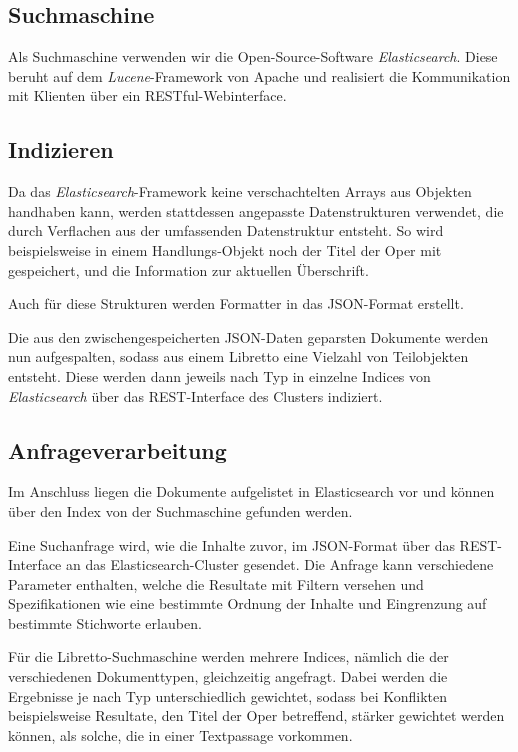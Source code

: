 \subsection{Suchmaschine}
Als Suchmaschine verwenden wir die Open-Source-Software \emph{Elasticsearch}.
Diese beruht auf dem \emph{Lucene}-Framework von Apache
und realisiert die Kommunikation mit Klienten
über ein RESTful-Webinterface.

\subsection{Indizieren}

Da das \emph{Elasticsearch}-Framework
keine verschachtelten Arrays aus Objekten handhaben kann,
werden stattdessen angepasste Datenstrukturen verwendet,
die durch Verflachen aus der umfassenden Datenstruktur entsteht.
So wird beispielsweise in einem Handlungs-Objekt
noch der Titel der Oper mit gespeichert,
und die Information zur aktuellen Überschrift.

Auch für diese Strukturen werden Formatter in das JSON-Format erstellt.

Die aus den zwischengespeicherten JSON-Daten geparsten Dokumente
werden nun aufgespalten, sodass aus einem Libretto eine Vielzahl von
Teilobjekten entsteht.
Diese werden dann jeweils nach Typ in einzelne Indices
von \emph{Elasticsearch} über das REST-Interface des Clusters indiziert.

\subsection{Anfrageverarbeitung}

Im Anschluss liegen die Dokumente aufgelistet in Elasticsearch vor
und können über den Index von der Suchmaschine gefunden werden.

Eine Suchanfrage wird, wie die Inhalte zuvor,
im JSON-Format über das REST-Interface an das Elasticsearch-Cluster gesendet.
Die Anfrage kann verschiedene Parameter enthalten,
welche die Resultate mit Filtern versehen
und Spezifikationen wie eine bestimmte Ordnung der Inhalte
und Eingrenzung auf bestimmte Stichworte erlauben.

Für die Libretto-Suchmaschine werden mehrere Indices,
nämlich die der verschiedenen Dokumenttypen,
gleichzeitig angefragt.
Dabei werden die Ergebnisse je nach Typ unterschiedlich gewichtet,
sodass bei Konflikten beispielsweise Resultate,
den Titel der Oper betreffend,
stärker gewichtet werden können,
als solche, die in einer Textpassage vorkommen.

